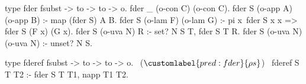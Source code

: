 \begin{elpicode}
  type fder fsubst -> to -> to -> o.
  fder _ (o-con C) (o-con C).
  fder S (o-app A) (o-app B) :- map (fder S) A B.
  fder S (o-lam F) (o-lam G) :-
    pi x\ fder S x x => fder S (F x) (G x).
  fder S (o-uva N) R :- set? N S T, fder S T R.
  fder S (o-uva N) (o-uva N) :- unset? N S.

  type fderef fsubst -> to -> to -> o.                 ~($\customlabel{pred:fder}{\rho s}$)~
  fderef S T T2 :- fder S T T1, napp T1 T2.
\end{elpicode}
